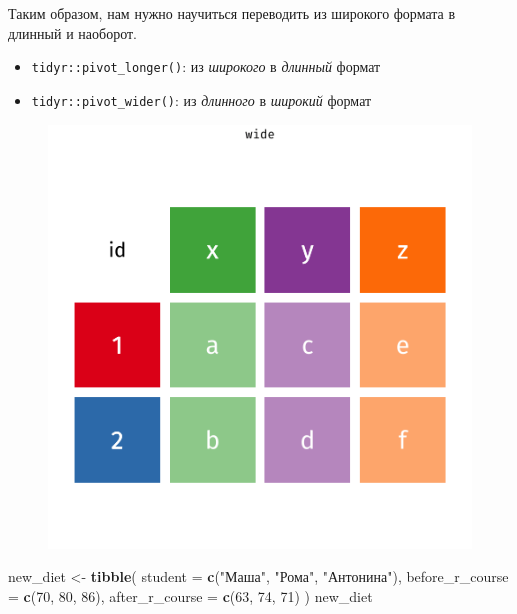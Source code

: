 \documentclass[]{book}
\newenvironment{Shaded}{\begin{snugshade}}{\end{snugshade}}
\newcommand{\KeywordTok}[1]{\textcolor[rgb]{0.13,0.29,0.53}{\textbf{#1}}}
\newcommand{\DataTypeTok}[1]{\textcolor[rgb]{0.13,0.29,0.53}{#1}}
\newcommand{\DecValTok}[1]{\textcolor[rgb]{0.00,0.00,0.81}{#1}}
\newcommand{\StringTok}[1]{\textcolor[rgb]{0.31,0.60,0.02}{#1}}
\newcommand{\NormalTok}[1]{#1}
\begin{document}
Таким образом, нам нужно научиться переводить из широкого формата в
длинный и наоборот.

\begin{itemize}
\item
  \texttt{tidyr::pivot\_longer()}: из \emph{широкого} в \emph{длинный}
  формат
\item
  \texttt{tidyr::pivot\_wider()}: из \emph{длинного} в \emph{широкий}
  формат
\end{itemize}

\begin{figure}
\centering
\includegraphics{images/tidyr-longer-wider.gif}
\caption{}
\end{figure}

\begin{Shaded}
\begin{Highlighting}[]
\NormalTok{new_diet <-}\StringTok{ }\KeywordTok{tibble}\NormalTok{(}
  \DataTypeTok{student =} \KeywordTok{c}\NormalTok{(}\StringTok{"Маша"}\NormalTok{, }\StringTok{"Рома"}\NormalTok{, }\StringTok{"Антонина"}\NormalTok{),}
  \DataTypeTok{before_r_course =} \KeywordTok{c}\NormalTok{(}\DecValTok{70}\NormalTok{, }\DecValTok{80}\NormalTok{, }\DecValTok{86}\NormalTok{),}
  \DataTypeTok{after_r_course =} \KeywordTok{c}\NormalTok{(}\DecValTok{63}\NormalTok{, }\DecValTok{74}\NormalTok{, }\DecValTok{71}\NormalTok{)}
\NormalTok{)}
\NormalTok{new_diet}
\end{Highlighting}
\end{Shaded}
\end{document}

